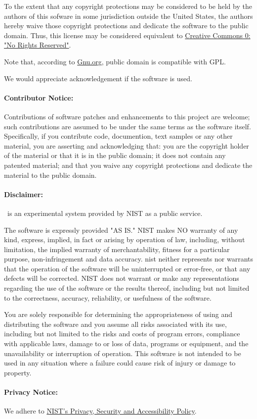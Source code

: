 \documentclass{article}
\begin{document}
To the extent that any copyright protections may be considered to be held
by the authors of this sofware in some jurisdiction outside the United
States, the authors hereby waive those copyright protections and dedicate
the software to the public domain. Thus, this license may be considered equivalent to
\href{https://creativecommons.org/about/cc0}{Creative Commons 0: "No Rights Reserved"}.

Note that, according to
\href{https://www.gnu.org/licences/license-list.html#PublicDomain}{Gnu.org},
public domain is compatible with GPL.

We would appreciate acknowledgement if the software is used.

\paragraph{Contributor Notice:}
  Contributions of software patches and enhancements to this project
are welcome; such contributions are assumed to be under the same terms
as the software itself.  Specifically, if you contribute code, documention,
text samples or any other material, you are asserting and acknowledging that:
you are the copyright holder of the material or that it is in the public domain;
it does not contain any patented material; and that you waive any copyright
protections and dedicate the material to the public domain.

\paragraph{Disclaimer:}
  \LaTeXML\ is an experimental system provided by NIST as a public service.

The software is expressly provided "AS IS." NIST makes NO warranty of
any kind, express, implied, in fact or arising by operation of law,
including, without limitation, the implied warranty of
merchantability, fitness for a particular purpose, non-infringement
and data accuracy. nist neither represents nor warrants that the
operation of the software will be uninterrupted or error-free, or that
any defects will be corrected. NIST does not warrant or make any
representations regarding the use of the software or the results
thereof, including but not limited to the correctness, accuracy,
reliability, or usefulness of the software.

You are solely responsible for determining the appropriateness of
using and distributing the software and you assume all risks
associated with its use, including but not limited to the risks and
costs of program errors, compliance with applicable laws, damage to or
loss of data, programs or equipment, and the unavailability or
interruption of operation. This software is not intended to be used in
any situation where a failure could cause risk of injury or damage to
property.

\paragraph{Privacy Notice:}
We adhere to \href{https://www.nist.gov/public_affairs/privacy.cfm}{NIST's Privacy, Security and Accessibility Policy}.
\end{document}
